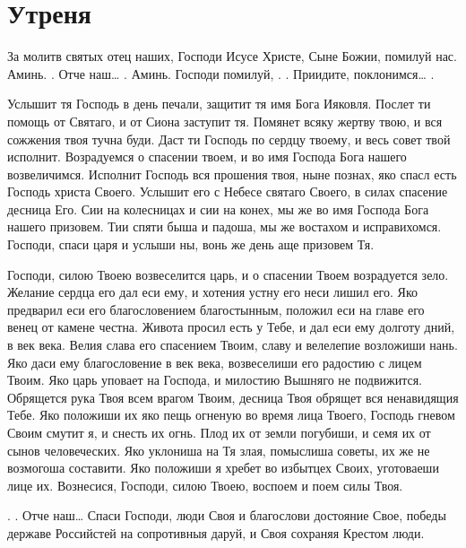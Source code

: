 \section{Утреня}\begin{mymulticols}





За молитв святых отец наших, Господи Исусе Христе, Сыне Божии, помилуй нас. Аминь. .  Отче наш… . Аминь. Господи помилуй, . . Приидите, поклонимся… .




Услышит тя Господь в день печали, защитит тя имя Бога Ияковля. Послет ти помощь от Святаго, и от Сиона заступит тя. Помянет всяку жертву твою, и вся сожжения твоя тучна буди. Даст ти Господь по сердцу твоему, и весь совет твой исполнит. Возрадуемся о спасении твоем, и во имя Господа Бога нашего возвеличимся. Исполнит Господь вся прошения твоя, ныне познах, яко спасл есть Господь христа Своего. Услышит его с Небесе святаго Своего, в силах спасение десница Его. Сии на колесницах и сии на конех, мы же во имя Господа Бога нашего призовем. Тии спяти быша и падоша, мы же востахом и исправихомся. Господи, спаси царя и услыши ны, вонь же день аще призовем Тя. 




Господи, силою Твоею возвеселится царь, и о спасении Твоем возрадуется зело. Желание сердца его дал еси ему, и хотения устну его неси лишил его. Яко предварил еси его благословением благостынным, положил еси на главе его венец от камене честна. Живота просил есть у Тебе, и дал еси ему долготу дний, в век века. Велия слава его спасением Твоим, славу и велелепие возложиши нань. Яко даси ему благословение в век века, возвеселиши его радостию с лицем Твоим. Яко царь уповает на Господа, и милостию Вышняго не подвижится. Обрящется рука Твоя всем врагом Твоим, десница Твоя обрящет вся ненавидящия Тебе. Яко положиши их яко пещь огненую во время лица Твоего, Господь гневом Своим смутит я, и снесть их огнь. Плод их от земли погубиши, и семя их от сынов человеческих. Яко уклониша на Тя злая, помыслиша советы, их же не возмогоша составити. Яко положиши я хребет во избытцех Своих, уготоваеши лице их. Вознесися, Господи, силою Твоею, воспоем и поем силы Твоя. 

. .  Отче наш…  Спаси Господи, люди Своя и благослови достояние Свое, победы державе Российстей на сопротивныя даруй, и Своя сохраняя Крестом люди.


\end{mymulticols}
